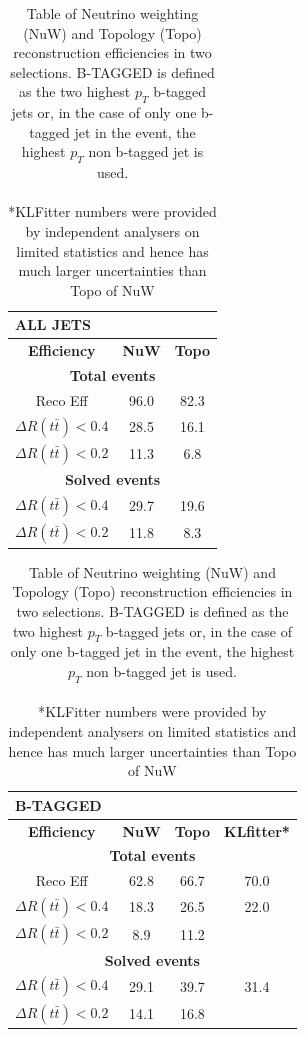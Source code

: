 \begin{table}[htbp!]
\begin{center}
	\begin{tabular}{  c  c  c  }
	\multicolumn{3}{l}{\textbf{ALL JETS}} \\
	\hline
	\textbf{Efficiency}       & \textbf{NuW} & \textbf{Topo} \\
	\hline
	\multicolumn{3}{c}{ \textbf{Total events} } \\
	Reco Eff                  & 96.0 & 82.3 \\
	$\Delta R(t\bar{t})<0.4$  & 28.5 & 16.1 \\
	$\Delta R(t\bar{t})<0.2$  & 11.3 &  6.8 \\
	\hline
	\multicolumn{3}{c}{ \textbf{Solved events} } \\
	$\Delta R(t\bar{t})<0.4$  & 29.7 & 19.6 \\
	$\Delta R(t\bar{t})<0.2$  & 11.8 &  8.3 \\	
	\hline
   \end{tabular}
    \quad
\quad	
\quad
    \begin{tabular}{ c c c c }
	\multicolumn{4}{l}{\textbf{B-TAGGED}} \\
	\hline
	\textbf{Efficiency}       & \textbf{NuW} & \textbf{Topo} & \textbf{KLfitter*} \\
	\hline
    \multicolumn{4}{c}{ \textbf{Total events} }    \\
	Reco Eff                  & 62.8 & 66.7 & 70.0 \\
	$\Delta R(t\bar{t})<0.4$  & 18.3 & 26.5 & 22.0 \\
	$\Delta R(t\bar{t})<0.2$  &  8.9 & 11.2 &      \\
	\hline
    \multicolumn{4}{c}{ \textbf{Solved events} }   \\
	$\Delta R(t\bar{t})<0.4$  & 29.1 & 39.7 & 31.4 \\
	$\Delta R(t\bar{t})<0.2$  & 14.1 & 16.8 &      \\	
	\hline	
	\end{tabular}
	\end{center}
	\caption{Table of Neutrino weighting (NuW) and Topology (Topo) reconstruction efficiencies in two selections. B-TAGGED is defined as the two highest $p_T$ b-tagged jets or, in the case of only one b-tagged jet in the event, the highest $p_T$ non b-tagged jet is used. \\ \\ \footnotesize{*KLFitter numbers were provided by independent analysers on limited statistics and hence has much larger uncertainties than Topo of NuW}}
\label{tab:nueff}
\end{table}



